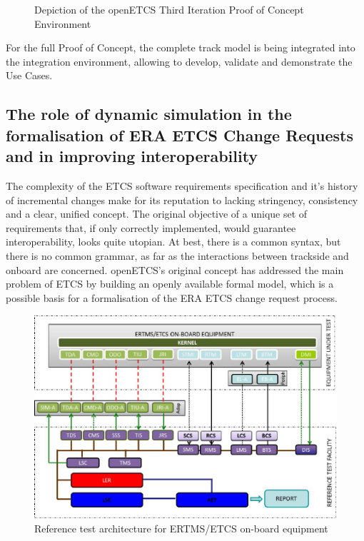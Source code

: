 \documentclass{template/openetcs_article}
\begin{document}
\begin{enumerate}
\begin{figure}[H]
  \caption{Depiction of the openETCS Third Iteration Proof of Concept Environment}
  \label{fig:POC}
\end{figure}
For the full Proof of Concept, the complete track model is being integrated into the integration environment, allowing to develop, validate and demonstrate the Use Cases.
\end{enumerate}



\subsection{The role of dynamic simulation in the formalisation of ERA ETCS Change Requests and in improving interoperability}

The complexity of the ETCS software requirements specification and it's history of incremental changes make for its reputation to lacking stringency, consistency and a clear, unified concept. 
The original objective of a unique set of requirements that, if only correctly implemented, would guarantee interoperability, looks quite utopian.
At best, there is a common syntax, but there is no common grammar, as far as the interactions between trackside and onboard are concerned.\newline
openETCS's original concept has addressed the main problem of ETCS by building an openly available formal model, which is a possible basis for a formalisation of the ERA ETCS change request process.
\begin{figure}
 \centering
  \includegraphics[width=\textwidth]{images/SUBSET-094-v300-3-overview}
  \caption{Reference test architecture for ERTMS/ETCS on-board equipment}
   \label{fig:Subs94}
\end{figure}
\end{document}
